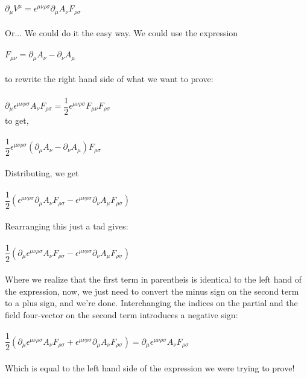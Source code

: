 \documentclass[prb,preprint]
{revtex4-1}
\begin{document}
\\
$\partial_\mu V^\mu = \epsilon^{\mu\nu\rho\sigma}\partial_\mu A_\nu F_{\rho\sigma}$
\\
\\
Or... We could do it the easy way.  We could use the expression 
\\
\\
$F_{\mu\nu} = \partial_\mu A_\nu - \partial_\nu A_\mu$ 
\\
\\
to rewrite the right hand side of what we want to prove:
\\
\\
$\partial_\mu \epsilon^{\mu\nu\rho\sigma}A_\nu F_{\rho\sigma} = \dfrac{1}{2}\epsilon^{\mu\nu\rho\sigma}F_{\mu\nu}F_{\rho\sigma}$
\\
to get, 
\\
\\
$\dfrac{1}{2}\epsilon^{\mu\nu\rho\sigma} \left(\partial_\mu A_\nu - \partial_\nu A_\mu\right)F_{\rho\sigma}$
\\
\\
Distributing, we get
\\
\\
$\dfrac{1}{2} \left(\epsilon^{\mu\nu\rho\sigma} \partial_\mu A_\nu F_{\rho\sigma} - \epsilon^{\mu\nu\rho\sigma} \partial_\nu A_\mu F_{\rho\sigma}\right)$
\\
\\
Rearranging this just a tad gives:
\\
\\
$\dfrac{1}{2} \left(\partial_\mu \epsilon^{\mu\nu\rho\sigma}  A_\nu F_{\rho\sigma} - \epsilon^{\mu\nu\rho\sigma} \partial_\nu A_\mu F_{\rho\sigma}\right)$
\\
\\
Where we realize that the first term in parentheis is identical to the left hand of the expression, now, we just need to convert the minus sign on the second term to a plus sign, and we're done.  Interchanging the indices on the partial and the field four-vector on the second term introduces a negative sign:
\\
\\
$\dfrac{1}{2} \left(\partial_\mu \epsilon^{\mu\nu\rho\sigma}  A_\nu F_{\rho\sigma} + \epsilon^{\mu\nu\rho\sigma} \partial_\mu A_\nu F_{\rho\sigma}\right) = \partial_\mu \epsilon^{\mu\nu\rho\sigma}A_\nu F_{\rho\sigma}$
\\
\\
Which is equal to the left hand side of the expression we were trying to prove!
\end{document}
